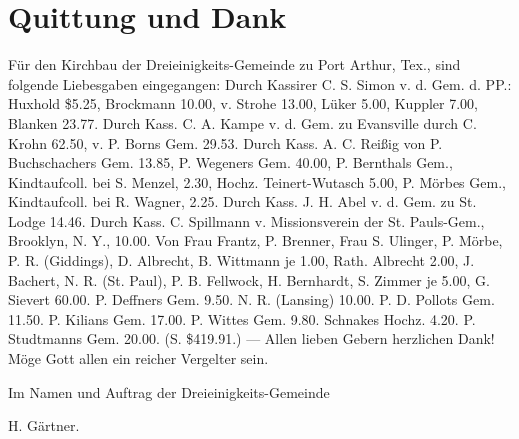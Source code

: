 \chapter{Quittung und Dank}

Für den Kirchbau der Dreieinigkeits-Gemeinde zu Port Arthur, Tex., sind folgende Liebesgaben eingegangen: Durch Kassirer C. S. Simon v. d. Gem. d. PP.: Huxhold \$5.25, Brockmann 10.00, v. Strohe 13.00, Lüker 5.00, Kuppler 7.00, Blanken 23.77. Durch Kass. C. A. Kampe v. d. Gem. zu Evansville durch C. Krohn 62.50, v. P. Borns Gem. 29.53. Durch Kass. A. C. Reißig von P. Buchschachers Gem. 13.85, P. Wegeners Gem. 40.00, P. Bernthals Gem., Kindtaufcoll. bei S. Menzel, 2.30, Hochz. Teinert-Wutasch 5.00, P. Mörbes Gem., Kindtaufcoll. bei R. Wagner, 2.25. Durch Kass. J. H. Abel v. d. Gem. zu St. Lodge 14.46. Durch Kass. C. Spillmann v. Missionsverein der St. Pauls-Gem., Brooklyn, N. Y., 10.00. Von Frau Frantz, P. Brenner, Frau S. Ulinger, P. Mörbe, P. R. (Giddings), D. Albrecht, B. Wittmann je 1.00, Rath. Albrecht 2.00, J. Bachert, N. R. (St. Paul), P. B. Fellwock, H. Bernhardt, S. Zimmer je 5.00, G. Sievert 60.00. P. Deffners Gem. 9.50. N. R. (Lansing) 10.00. P. D. Pollots Gem. 11.50. P. Kilians Gem. 17.00. P. Wittes Gem. 9.80. Schnakes Hochz. 4.20. P. Studtmanns Gem. 20.00. (S. \$419.91.) — Allen lieben Gebern herzlichen Dank! Möge Gott allen ein reicher Vergelter sein.

Im Namen und Auftrag der Dreieinigkeits-Gemeinde

H. Gärtner.

